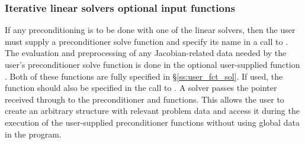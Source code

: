 \subsubsection{Iterative linear solvers optional input functions}\label{sss:optin_spils}
If any preconditioning is to be done with one of the {\kinspils} linear
solvers, then the user must supply a preconditioner solve function 
and specify its name in a call to .
The evaluation and preprocessing of any Jacobian-related data needed
by the user's preconditioner solve function is done in the optional
user-supplied function . Both of these functions are
fully specified in \S\ref{ss:user_fct_sol}.
If used, the  function should also be specified in the call to
.
A {\kinspils} solver passes the pointer 
received through  to the preconditioner
 and  functions.  This allows the user to create
an arbitrary structure with relevant problem data and access it during
the execution of the user-supplied preconditioner functions without using
global data in the program.

